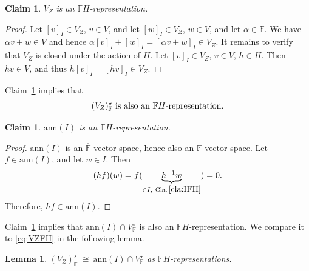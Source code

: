 \documentclass[a4paper]{extarticle}
\newcommand{\IF}{\mathbb{F}}
\newcommand{\oIF}{{\overline{\mathbb{F}}}}
\newcommand{\ann}{\mathrm{ann}}
\newcommand{\coinv}{V_Z}
\numberwithin{theorem}{section}
\newtheorem{lemma}[theorem]{Lemma}
\newtheorem{claim}[theorem]{Claim}
\theoremstyle{definition}
\begin{document}
\begin{claim}\label{cla:VZFH}
$\coinv$ is an $\IF H$-representation.
\end{claim}
\begin{proof}
Let $[v]_I \in \coinv$, $v\in V$, and let $[w]_I \in \coinv$, $w\in V$, and let $\alpha \in \IF$.
We have $\alpha v + w\in V$ and hence $\alpha[v]_I+[w]_I = [\alpha v+w]_I \in \coinv$.
It remains to verify that $\coinv$ is closed under the action of $H$.
Let $[v]_I \in \coinv$, $v\in V$, $h\in H$.
Then $hv\in V$, and thus $h[v]_I=[hv]_I \in \coinv$.
\end{proof}
Claim~\ref{cla:VZFH} implies that
\begin{equation}\label{eq:VZFH}
\textup{$(\coinv)^\star_\IF$ is also an $\IF H$-representation.}
\end{equation}
\begin{claim}\label{cla:annIFH}
$\ann(I)$ is an $\IF H$-representation.
\end{claim}
\begin{proof}
$\ann(I)$ is an $\oIF$-vector space, hence also an $\IF$-vector space.
Let $f\in\ann(I)$, and let $w\in I$. Then
\[
(hf)(w)=f(\underbrace{h^{-1}w}_{\in I, \  \textup{Cla.}\,\ref{cla:IFH}}) = 0.
\]
Therefore, $hf\in\ann(I)$.
\end{proof}
Claim~\ref{cla:annIFH} implies that $\ann(I)\cap V^\star_\IF$ is also an $\IF H$-representation.
We compare it to \eqref{eq:VZFH} in the following lemma.
\begin{lemma}\label{lem:VZannihilator}
$(\coinv)^\star_\IF \ \cong \ \ann(I) \cap V^\star_\IF$ as $\IF H$-representations.
\end{lemma}
\end{document}
